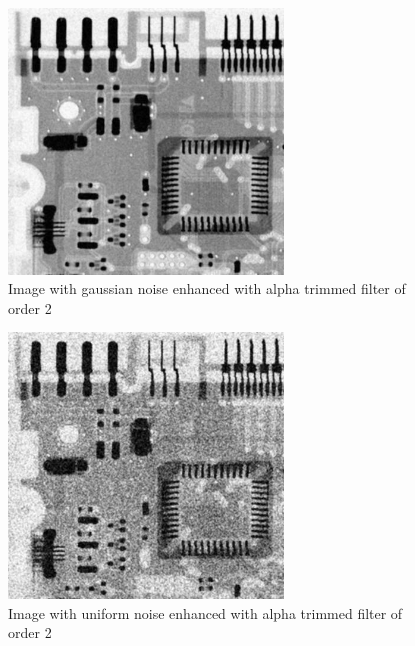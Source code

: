 \documentclass[10pt]{article}
\begin{document}
\begin{figure}[!ht]
	\centering
	\includegraphics[height=200pt]{./ex4/gaussalpha2.jpg}
	\caption{Image with gaussian noise enhanced with alpha trimmed filter of order 2}
\end{figure}
\begin{figure}[!ht]
	\centering
	\includegraphics[height=200pt]{./ex4/unialpha2.jpg}
	\caption{Image with uniform noise enhanced with alpha trimmed filter of order 2}
\end{figure}


\clearpage
\end{document}
